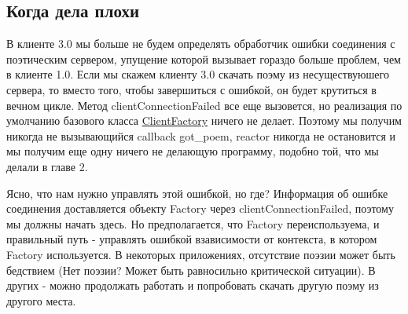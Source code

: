\subsection{Когда дела плохи}


В клиенте 3.0 мы больше не будем определять 
обработчик ошибки соединения с поэтическим сервером, 
упущение которой вызывает гораздо больше проблем, чем в клиенте 1.0. 
Если мы скажем клиенту 3.0 скачать поэму из несуществуюшего 
сервера, то вместо того, чтобы завершиться с ошибкой, он будет крутиться в вечном цикле. 
Метод clientConnectionFailed все еще вызовется, но 
реализация по умолчанию базового класса 
\href{http://twistedmatrix.com/trac/browser/tags/releases/twisted-8.2.0/twisted/internet/protocol.py#L103}{ClientFactory} 
ничего не 
делает. Поэтому мы получим никогда не вызывающийся callback got\_poem,
reactor никогда не остановится и мы получим еще одну ничего 
не делающую программу, подобно той, что мы делали в главе 2.



Ясно, что нам нужно управлять этой ошибкой, но где? 
Информация об ошибке соединения доставляется объекту 
Factory через clientConnectionFailed, поэтому мы должны 
начать здесь. Но предполагается, что Factory переиспользуема, и 
правильный путь - управлять ошибкой взависимости от контекста, 
в котором Factory используется. В некоторых приложениях, 
отсутствие поэзии может быть бедствием (Нет поэзии? Может быть равносильно 
критической ситуации). В других - можно продолжать работать и попробовать 
скачать другую поэму из другого места.   


